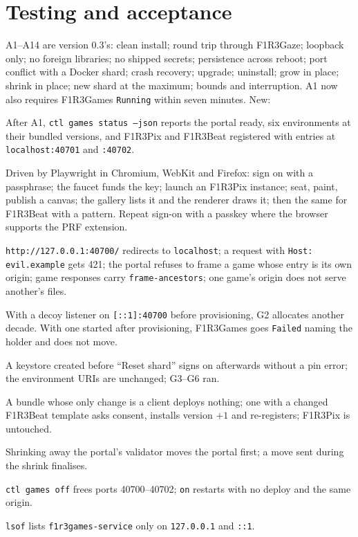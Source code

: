 \documentclass[11pt]{article}
\theoremstyle{definition}
\theoremstyle{remark}
\newcommand{\code}[1]{\texttt{#1}}
\newcommand{\Gz}{F1R3Gaze}
\newcommand{\Gm}{F1R3Games}
\begin{document}
\section{Testing and acceptance}\label{sec:accept}

A1--A14 are version 0.3's: clean install; round trip through \Gz{}; loopback only; no
foreign libraries; no shipped secrets; persistence across reboot; port conflict with
a Docker shard; crash recovery; upgrade; uninstall; grow in place; shrink in place;
new shard at the maximum; bounds and interruption. A1 now also requires \Gm{}
\code{Running} within seven minutes. New:

\begin{description}[leftmargin=1.5em,style=nextline,itemsep=2pt]
\item[A15 \Gm{} installed.] After A1, \code{ctl games status --json} reports the
  portal ready, six environments at their bundled versions, and F1R3Pix and F1R3Beat
  registered with entries at \code{localhost:40701} and \code{:40702}.
\item[A16 Playing in a stock browser.] Driven by Playwright in Chromium, WebKit and
  Firefox: sign on with a passphrase; the faucet funds the key; launch an F1R3Pix
  instance; seat, paint, publish a canvas; the gallery lists it and the renderer
  draws it; then the same for F1R3Beat with a pattern. Repeat sign-on with a passkey
  where the browser supports the PRF extension.
\item[A17 Origins.] \code{http://127.0.0.1:40700/} redirects to \code{localhost}; a
  request with \code{Host: evil.example} gets 421; the portal refuses to frame a game
  whose entry is its own origin; game responses carry \code{frame-ancestors}; one
  game's origin does not serve another's files.
\item[A18 Dual stack.] With a decoy listener on \code{[::1]:40700} before
  provisioning, G2 allocates another decade. With one started after provisioning,
  \Gm{} goes \code{Failed} naming the holder and does not move.
\item[A19 Reset keeps identities.] A keystore created before ``Reset shard'' signs on
  afterwards without a pin error; the environment URIs are unchanged; G3--G6 ran.
\item[A20 Upgrades.] A bundle whose only change is a client deploys nothing; one with
  a changed F1R3Beat template asks consent, installs version $+1$ and re-registers;
  F1R3Pix is untouched.
\item[A21 Evacuation.] Shrinking away the portal's validator moves the portal first;
  a move sent during the shrink finalises.
\item[A22 Off and on.] \code{ctl games off} frees ports 40700--40702; \code{on}
  restarts with no deploy and the same origin.
\item[A23 Loopback.] \code{lsof} lists \code{f1r3games-service} only on
  \code{127.0.0.1} and \code{::1}.
\end{description}
\end{document}
